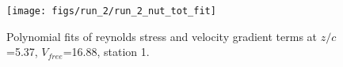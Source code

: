 \begin{figure}[H]
\centering
\texttt{[image: figs/run\_2/run\_2\_nut\_tot\_fit]}
\caption{Polynomial fits of reynolds stress and velocity gradient terms at $z/c$=5.37, $V_{free}$=16.88, station 1.}
\label{fig:run_2_nut_tot_fit}
\end{figure}


